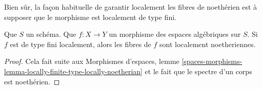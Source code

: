 \noindent
Bien sûr, la façon habituelle de garantir localement les fibres de noethérien est
à supposer que le morphisme est localement de type fini.

\begin{lemma}
\label{lemma-locally-finite-type-locally-Noetherian-fibres}
Que $S$ un schéma. Que $f : X \to Y$ un morphisme des espaces algébriques
sur $S$. Si $f$ est de type fini localement, alors 
les fibres de $f$ sont localement noetheriennes.
\end{lemma}

\begin{proof}
Cela fait suite aux Morphismes d'espaces, lemme
\ref{spaces-morphisms-lemma-locally-finite-type-locally-noetherian}
et le fait que le spectre d'un corps est noethérien.
\end{proof}

